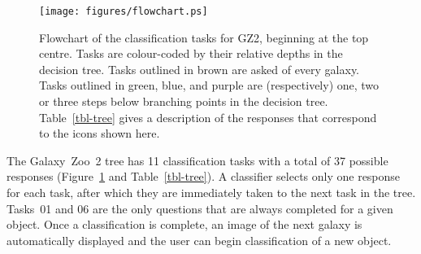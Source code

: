 \documentclass[useAMS,usenatbib]{mn2e}
\begin{document}
\begin{figure}
\texttt{[image: figures/flowchart.ps]}
\caption{Flowchart of the classification tasks for GZ2, beginning at the top centre. Tasks are colour-coded by their relative depths in the decision tree. Tasks outlined in brown are asked of every galaxy. Tasks outlined in green, blue, and purple are (respectively) one, two or three steps below branching points in the decision tree. Table~\ref{tbl-tree} gives a description of the responses that correspond to the icons shown here. 
\label{fig-flowchart}}
\end{figure}

The Galaxy~Zoo~2 tree has 11 classification tasks with a total of 37 possible responses (Figure~\ref{fig-flowchart} and Table~\ref{tbl-tree}). A classifier selects only one response for each task, after which they are immediately taken to the next task in the tree. Tasks~01 and 06 are the only questions that are always completed for a given object. Once a classification is complete, an image of the next galaxy is automatically displayed and the user can begin classification of a new object. 
\end{document}
